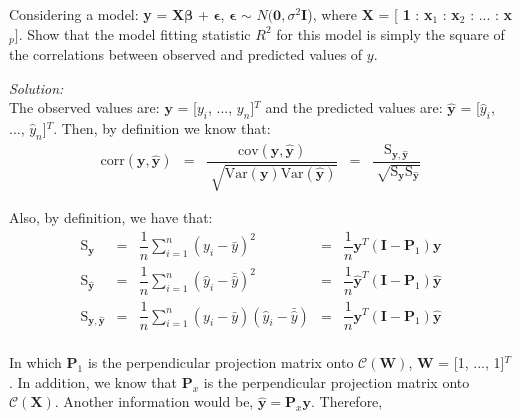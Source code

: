 \documentclass[a4paper, 11pt]{article}
\begin{document}
Considering a model: \textbf{y} = \textbf{X}$\boldsymbol{\beta}$ + $\boldsymbol{\epsilon}$, $\boldsymbol{\epsilon}$ $\sim$ $N(\textbf{0}, \sigma^2$\textbf{I}), where $\textbf{X}$ = [ \textbf{1} : \textbf{x}$_1$ : \textbf{x}$_2$ : ... : \textbf{x}$_p]$. Show that the model fitting statistic $R^2$ for this model is simply the square of the correlations between observed and predicted values of $y$.

\noindent
\textit{Solution:}\\

The observed values are: $\textbf{y}$ = [$y_i$, ..., $y_n$]$^T$ and the predicted values are: $\hat{\textbf{y}}$ = [$\hat{y}_i$, ..., $\hat{y}_n$]$^T$. Then, by definition we know that:
\begin{equation*}
\begin{array}{lclllll}
\mbox{corr}(\textbf{y}, \hat{\textbf{y}}) & = & \dfrac{\mbox{cov}(\textbf{y}, \hat{\textbf{y}})}{\displaystyle\sqrt[]{\mbox{Var}(\textbf{y})\mbox{Var}(\hat{\textbf{y}})}} & = & \dfrac{\mbox{S}_{\textbf{y},\hat{\textbf{y}}}}{\displaystyle\sqrt[]{\mbox{S}_{\textbf{y}} \mbox{S}_{\hat{\textbf{y}}}}}
\end{array}
\end{equation*}

Also, by definition, we have that:
\begin{equation*}
\begin{array}{lclllll}
\mbox{S}_{\textbf{y}} & = & \dfrac{1}{n} \displaystyle\sum_{i=1}^{n}(y_i - \bar{y})^2 & = & \dfrac{1}{n} \textbf{y}^T(\textbf{I} - \textbf{P}_1)\textbf{y} \\

\mbox{S}_{\hat{\textbf{y}}} & = & \dfrac{1}{n} \displaystyle\sum_{i=1}^{n}(\hat{y}_i - \bar{\hat{y}})^2 & = & \dfrac{1}{n} \hat{\textbf{y}}^T(\textbf{I} - \textbf{P}_1)\hat{\textbf{y}} \\

\mbox{S}_{\textbf{y},\hat{\textbf{y}}} & = & \dfrac{1}{n} \displaystyle\sum_{i=1}^{n}(y_i - \bar{y})(\hat{y}_i - \bar{\hat{y}}) & = & \dfrac{1}{n} \textbf{y}^T(\textbf{I} - \textbf{P}_1)\hat{\textbf{y}} \\
\end{array}
\end{equation*}

In which $\textbf{P}_1$ is the perpendicular projection matrix onto $\mathcal{C}(\textbf{W})$, \textbf{W} = [1, ..., 1]$^T$. In addition, we know that $\textbf{P}_x$ is the perpendicular projection matrix onto $\mathcal{C}(\textbf{X})$. Another information would be, $\hat{\textbf{y}} = \textbf{P}_x\textbf{y}$. Therefore,
\end{document}
